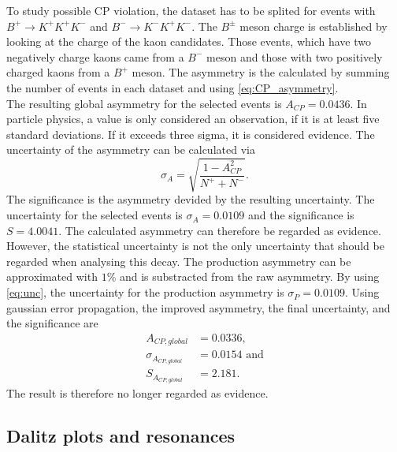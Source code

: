 To study possible CP violation, the dataset has to be splited for events with $B^+ \rightarrow K^+ K^+ K^-$ and $B^- \rightarrow K^- K^+ K^-$. The $B^{\pm}$ meson charge is established by 
looking at the charge of the kaon candidates. Those events, which have two negatively charge kaons came from a $B^-$ meson and those with two positively charged kaons from a $B^+$ meson.
The asymmetry is the calculated by summing the number of events in each dataset and using \autoref{eq:CP_asymmetry}.\\
The resulting global asymmetry for the selected events is $A_{CP} = 0.0436$. In particle physics, a value is only considered an observation, if it is at least five standard deviations. If it exceeds
three sigma, it is considered evidence. The uncertainty of the asymmetry can be calculated via
\begin{equation}
  \label{eq:unc}
  \sigma_A = \sqrt{\frac{1-A_{CP}^2}{N^+ + N^-}}.
\end{equation}
The significance is the asymmetry devided by the resulting uncertainty. The uncertainty for the selected events is $\sigma_A = 0.0109$ and the significance is $S = 4.0041$. The calculated asymmetry can therefore be regarded 
as evidence.\\
However, the statistical uncertainty is not the only uncertainty that should be regarded when analysing this decay. The production asymmetry can be approximated with $1\%$ and is substracted from the raw asymmetry. By using \autoref{eq:unc}, the uncertainty
for the production asymmetry is $\sigma_P = 0.0109$. Using gaussian error propagation, the improved asymmetry, the final uncertainty, and the significance are
\begin{align*}
  A_{CP, global} &= 0.0336,\\
  \sigma_{A_{CP,global}} &=  0.0154\, \, \mathrm{and}\\
  S_{A_{CP,global}} &= 2.181.
\end{align*}
The result is therefore no longer regarded as evidence.

\subsection{Dalitz plots and resonances}

